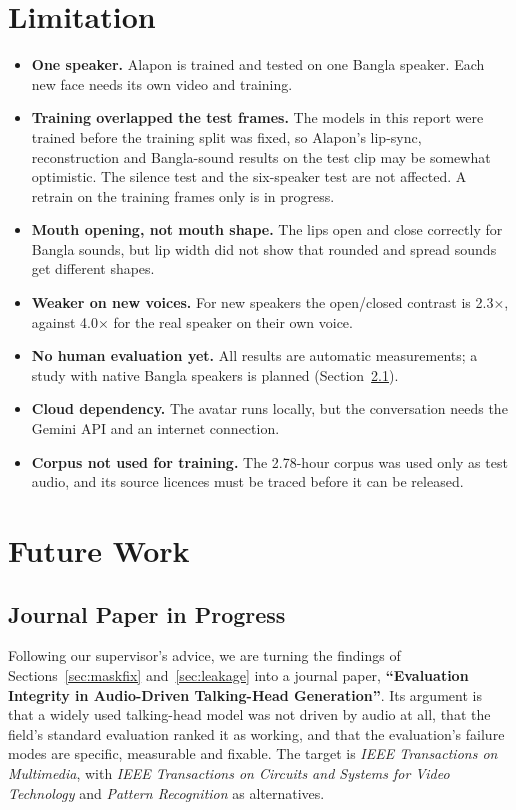 \section{Limitation}
\label{sec:limitation}

\begin{itemize}
    \item \textbf{One speaker.} Alapon is trained and tested on one Bangla speaker. Each new face needs its own video and training.
    \item \textbf{Training overlapped the test frames.} The models in this report were trained before the training split was fixed, so Alapon's lip-sync, reconstruction and Bangla-sound results on the test clip may be somewhat optimistic. The silence test and the six-speaker test are not affected. A retrain on the training frames only is in progress.
    \item \textbf{Mouth opening, not mouth shape.} The lips open and close correctly for Bangla sounds, but lip width did not show that rounded and spread sounds get different shapes.
    \item \textbf{Weaker on new voices.} For new speakers the open/closed contrast is 2.3$\times$, against 4.0$\times$ for the real speaker on their own voice.
    \item \textbf{No human evaluation yet.} All results are automatic measurements; a study with native Bangla speakers is planned (Section~\ref{sec:journal}).
    \item \textbf{Cloud dependency.} The avatar runs locally, but the conversation needs the Gemini API and an internet connection.
    \item \textbf{Corpus not used for training.} The 2.78-hour corpus was used only as test audio, and its source licences must be traced before it can be released.
\end{itemize}

\section{Future Work}

\subsection{Journal Paper in Progress}
\label{sec:journal}

Following our supervisor's advice, we are turning the findings of Sections~\ref{sec:maskfix} and~\ref{sec:leakage} into a journal paper, \textbf{``Evaluation Integrity in Audio-Driven Talking-Head Generation''}. Its argument is that a widely used talking-head model was not driven by audio at all, that the field's standard evaluation ranked it as working, and that the evaluation's failure modes are specific, measurable and fixable. The target is \textit{IEEE Transactions on Multimedia}, with \textit{IEEE Transactions on Circuits and Systems for Video Technology} and \textit{Pattern Recognition} as alternatives.\\

